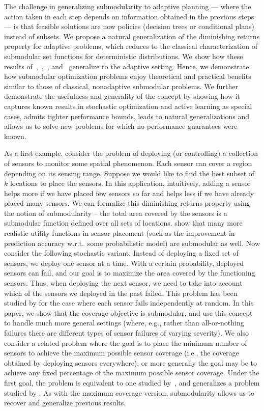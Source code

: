 The challenge in generalizing
submodularity to adaptive planning --- where the action taken in each
step depends on information obtained in the previous steps  --- is that feasible solutions are now
policies (decision trees or conditional plans) instead of subsets. We propose a natural
generalization of the diminishing returns property for adaptive
problems, which reduces to the classical characterization of submodular set
functions for deterministic distributions. We show how these results
of~\citet{nemhauser78},~\citet{wolsey82},~\citet{streeter08},
and~\citet{minoux78} generalize to the adaptive setting.  Hence,
we demonstrate how \term submodular optimization problems enjoy
theoretical and practical benefits similar to those of classical,
nonadaptive submodular problems. We further demonstrate the usefulness
and generality of the concept by showing how it captures known results
in stochastic optimization and active learning as special cases,
admits tighter performance bounds,  leads to natural generalizations
and allows us to solve new problems for which no performance guarantees were known.

As a first example, consider the problem of deploying (or controlling) a collection of
sensors to monitor some spatial phenomenon. Each sensor can cover a
region depending on its sensing range. Suppose we would like to find
the best subset of $k$ locations to place the sensors.  In this
application, intuitively, adding a sensor helps more if we have placed
few sensors so far and helps less if we have already placed many sensors. We can formalize this diminishing returns property using the notion of submodularity --
the total area covered by the sensors is a submodular function defined
over all sets of locations.  \citet{krause07nearoptimal} show that
many more realistic utility functions in sensor placement (such as the
improvement in prediction accuracy w.r.t.~some probabilistic model)
are submodular as well. Now consider the following stochastic variant:
Instead of deploying a fixed set of sensors, we deploy one sensor at a
time.  With a certain probability, deployed sensors can fail, and our
goal is to maximize the area covered by the functioning sensors.
Thus, when deploying the next sensor, we need to take into account
which of the sensors we deployed in the past failed.  This problem has
been studied by \citet{AsadpourNS08} for the case where each sensor
fails independently at random.  In this paper, we show that the
coverage objective is \term submodular, and use this concept to handle
much more general settings (where, e.g., rather than all-or-nothing
failures there are different types of sensor failures of varying severity).
%
We also consider a related problem where the goal is to place the minimum number of
sensors to achieve the maximum possible sensor coverage (i.e., the coverage
obtained by deploying sensors everywhere), or more generally the
goal may be to achieve any fixed percentage of the maximum possible
sensor coverage.  
Under the first goal, the problem is equivalent to one studied by~\citet{goemans06stochastic}, and 
generalizes a problem studied by \citet{liu08near}.  As with the
maximum coverage version, \term submodularity 
allows us to recover and generalize previous results.
 


